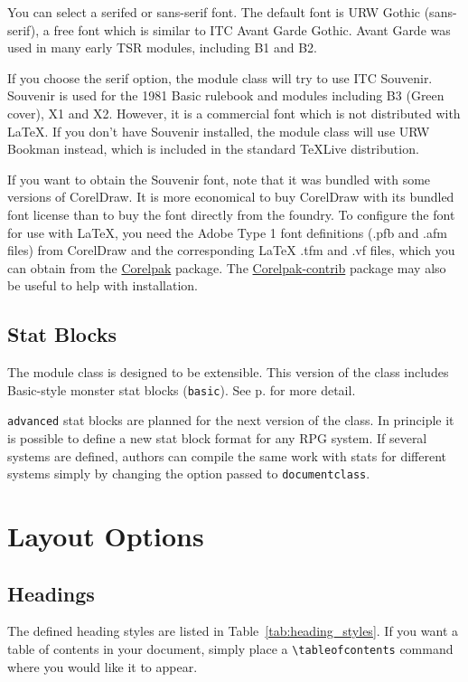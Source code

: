 \documentclass[a4paper,serif]{module}
\begin{document}
You can select a serifed or sans-serif font. The default font is URW Gothic (sans-serif), a free font which is similar to
ITC Avant Garde Gothic. Avant Garde was used in many early TSR modules, including B1 and B2.

If you choose the serif option, the module class will try to use ITC Souvenir. Souvenir is used for the 1981 Basic rulebook
and modules including B3 (Green cover), X1 and X2. However, it is a commercial font which is
not distributed with \LaTeX. If you don't have Souvenir installed, the module class will use URW Bookman instead, which is
included in the standard \TeX Live distribution.

If you want to obtain the Souvenir font, note that it was bundled with some versions of CorelDraw. It is more economical to buy
CorelDraw with its bundled font license than to buy the font directly from the foundry.
To configure the font for use with \LaTeX, you need the Adobe Type 1 font definitions (.pfb and .afm files) from CorelDraw
and the corresponding LaTeX .tfm and .vf files, which you can obtain from the \href{https://www.ctan.org/pkg/corelpak}{Corelpak} package. The
\href{https://www.ctan.org/pkg/corelpak-contrib}{Corelpak-contrib} package may also be useful to help with installation.

\subsection*{Stat Blocks}

The module class is designed to be extensible.  This version of the class includes Basic-style monster stat blocks
(\verb|basic|). See p.\pageref{stat_blocks} for more detail.

\verb|advanced| stat blocks are planned for the next version of the class. In principle it is possible to define a new stat
block format for any RPG system. If several systems are defined, authors can compile the same work with stats for different
systems simply by changing the option passed to \verb|documentclass|.

\section{Layout Options}

\subsection*{Headings}

The defined heading styles are listed in Table~\ref{tab:heading_styles}.
If you want a table of contents in your document, simply place a \verb|\tableofcontents| command where you would like it to appear.
\end{document}
